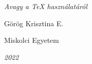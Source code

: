 \documentclass{article}
\begin{document}
\begin{titlepage}
\centering
{}

{\hfill \small\textit{Avagy a TeX használatáról}}
\vspace*{30em}

\Large Görög Krisztina E.

\Large Miskolci Egyetem

\small \textit{2022}
\clearpage
\end{titlepage}
\end{document}
